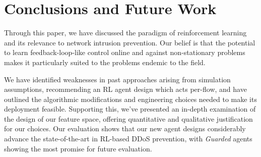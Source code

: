 \documentclass[10pt, times, comsoc]{IEEEtran}
\begin{document}

\section{Conclusions and Future Work}
Through this paper, we have discussed the paradigm of reinforcement learning and its relevance to network intrusion prevention.
Our belief is that the potential to learn feedback-loop-like control online and against non-stationary problems makes it particularly suited to the problems endemic to the field.

We have identified weaknesses in past approaches arising from simulation assumptions, recommending an RL agent design which acts per-flow, and have outlined the algorithmic modifications and engineering choices needed to make its deployment feasible.
Supporting this, we've presented an in-depth examination of the design of our feature space, offering quantitative and qualitative justification for our choices.
Our evaluation shows that our new agent designs considerably advance the state-of-the-art in RL-based DDoS prevention, with \emph{Guarded} agents showing the most promise for future evaluation.


\end{document}
